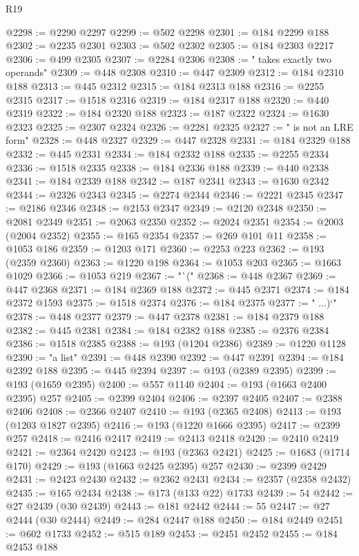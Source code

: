 \begin{lexlean}{R19}
\begin{coremodule}
@2298 := @2290 @2297
@2299 := @502 @2298
@2301 := @184 @2299 @188
@2302 := @2235 @2301
@2303 := @502 @2302
@2305 := @184 @2303 @2217
@2306 := @499 @2305
@2307 := @2284 @2306
@2308 := " takes exactly two operands"
@2309 := @448 @2308
@2310 := @447 @2309
@2312 := @184 @2310 @188
@2313 := @445 @2312
@2315 := @184 @2313 @188
@2316 := @2255 @2315
@2317 := @1518 @2316
@2319 := @184 @2317 @188
@2320 := @440 @2319
@2322 := @184 @2320 @188
@2323 := @187 @2322
@2324 := @1630 @2323
@2325 := @2307 @2324
@2326 := @2281 @2325
@2327 := " is not an LRE form"
@2328 := @448 @2327
@2329 := @447 @2328
@2331 := @184 @2329 @188
@2332 := @445 @2331
@2334 := @184 @2332 @188
@2335 := @2255 @2334
@2336 := @1518 @2335
@2338 := @184 @2336 @188
@2339 := @440 @2338
@2341 := @184 @2339 @188
@2342 := @187 @2341
@2343 := @1630 @2342
@2344 := @2326 @2343
@2345 := @2274 @2344
@2346 := @2221 @2345
@2347 := @2186 @2346
@2348 := @2153 @2347
@2349 := @2120 @2348
@2350 := @2081 @2349
@2351 := @2063 @2350
@2352 := @2024 @2351
@2354 := @2003 (@2004 @2352)
@2355 := @165 @2354
@2357 := @269 @101 @11
@2358 := @1053 @186
@2359 := @1203 @171
@2360 := @2253 @223
@2362 := @193 (@2359 @2360)
@2363 := @1220 @198
@2364 := @1053 @203
@2365 := @1663 @1029
@2366 := @1053 @219
@2367 := "`("
@2368 := @448 @2367
@2369 := @447 @2368
@2371 := @184 @2369 @188
@2372 := @445 @2371
@2374 := @184 @2372 @1593
@2375 := @1518 @2374
@2376 := @184 @2375
@2377 := " ...)`"
@2378 := @448 @2377
@2379 := @447 @2378
@2381 := @184 @2379 @188
@2382 := @445 @2381
@2384 := @184 @2382 @188
@2385 := @2376 @2384
@2386 := @1518 @2385
@2388 := @193 (@1204 @2386)
@2389 := @1220 @1128
@2390 := "a list"
@2391 := @448 @2390
@2392 := @447 @2391
@2394 := @184 @2392 @188
@2395 := @445 @2394
@2397 := @193 (@2389 @2395)
@2399 := @193 (@1659 @2395)
@2400 := @557 @1140
@2404 := @193 (@1663 @2400 @2395) @257
@2405 := @2399 @2404
@2406 := @2397 @2405
@2407 := @2388 @2406
@2408 := @2366 @2407
@2410 := @193 (@2365 @2408)
@2413 := @193 (@1203 @1827 @2395)
@2416 := @193 (@1220 @1666 @2395)
@2417 := @2399 @257
@2418 := @2416 @2417
@2419 := @2413 @2418
@2420 := @2410 @2419
@2421 := @2364 @2420
@2423 := @193 (@2363 @2421)
@2425 := @1683 (@1714 @170)
@2429 := @193 (@1663 @2425 @2395) @257
@2430 := @2399 @2429
@2431 := @2423 @2430
@2432 := @2362 @2431
@2434 := @2357 (@2358 @2432)
@2435 := @165 @2434
@2438 := @173 (@133 @22) @1733
@2439 := 54
@2442 := @27 @2439 (@30 @2439)
@2443 := @181 @2442
@2444 := 55
@2447 := @27 @2444 (@30 @2444)
@2449 := @284 @2447 @188
@2450 := @184 @2449
@2451 := @602 @1733
@2452 := @515 @189
@2453 := @2451 @2452
@2455 := @184 @2453 @188

\end{coremodule}
\end{lexlean}
